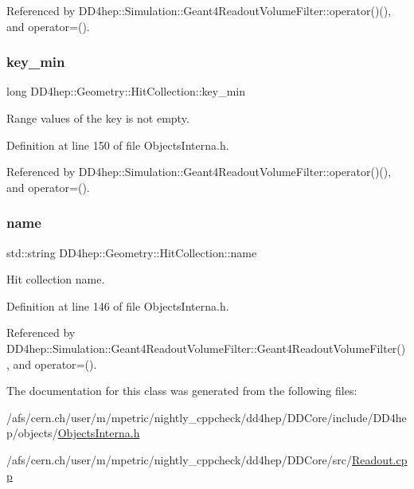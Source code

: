 Referenced by D\+D4hep\+::\+Simulation\+::\+Geant4\+Readout\+Volume\+Filter\+::operator()(), and operator=().

\hypertarget{class_d_d4hep_1_1_geometry_1_1_hit_collection_a34a3fcd70ef34e2b1ecb877805a0f682}{}\label{class_d_d4hep_1_1_geometry_1_1_hit_collection_a34a3fcd70ef34e2b1ecb877805a0f682} 
\subsubsection{\texorpdfstring{key\+\_\+min}{key\_min}}
{\footnotesize\ttfamily long D\+D4hep\+::\+Geometry\+::\+Hit\+Collection\+::key\+\_\+min}



Range values of the key is not empty. 



Definition at line 150 of file Objects\+Interna.\+h.



Referenced by D\+D4hep\+::\+Simulation\+::\+Geant4\+Readout\+Volume\+Filter\+::operator()(), and operator=().

\hypertarget{class_d_d4hep_1_1_geometry_1_1_hit_collection_a9c9a772a612f38f6104fd976f8b20ba0}{}\label{class_d_d4hep_1_1_geometry_1_1_hit_collection_a9c9a772a612f38f6104fd976f8b20ba0} 
\subsubsection{\texorpdfstring{name}{name}}
{\footnotesize\ttfamily std\+::string D\+D4hep\+::\+Geometry\+::\+Hit\+Collection\+::name}



Hit collection name. 



Definition at line 146 of file Objects\+Interna.\+h.



Referenced by D\+D4hep\+::\+Simulation\+::\+Geant4\+Readout\+Volume\+Filter\+::\+Geant4\+Readout\+Volume\+Filter(), and operator=().



The documentation for this class was generated from the following files\+:\begin{DoxyCompactItemize}
\item 
/afs/cern.\+ch/user/m/mpetric/nightly\+\_\+cppcheck/dd4hep/\+D\+D\+Core/include/\+D\+D4hep/objects/\hyperlink{_objects_interna_8h}{Objects\+Interna.\+h}\item 
/afs/cern.\+ch/user/m/mpetric/nightly\+\_\+cppcheck/dd4hep/\+D\+D\+Core/src/\hyperlink{_readout_8cpp}{Readout.\+cpp}\end{DoxyCompactItemize}
